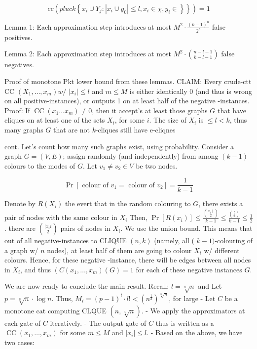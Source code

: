$$
\left.c c\left(p l u c k\left\{x_i \cup Y_j:\left|x_i \cup y_0\right| \leq l, x_i \in \chi, y_i \in\right\}\right\}\right)=1
$$


Lemma 1: Each approximation step introduces at most $M^2 \cdot \frac{(k-1)^n}{2^p}$ false positives.

Lemma 2: Each approximation step introduces at most $M^2 \cdot\binom{n-l-1}{k-l-1}$ false negatives.

Proof of monotone Pkt lower bound from these lemmas. CLAIM: Every crude-ctt CC $\left(X_1, \ldots, x_m\right) w /$ $\left|x_i\right| \leq l$ and $m \leqslant M$ is either identically 0 (and thus is wrong on all positive-instances), or outputs 1 on at least half of the negative -instances.
Proof: If $\operatorname{CC}\left(x_1 \ldots x_m\right) \neq 0$, then it accept's at least those graphs $G$ that have cliques on at least one of the sets $X_i$, for some $i$. The size of $X_i$ is $\leqslant l<k$, thus many graphs $G$ that are not $k$-cliques still have e-cliqnes



cont.
Let's count how many such graphs exist, using probability. Consider a graph $G=(V, E)$; assign randomly (and independently) from among $(k-1)$ colours to the modes of $G$. Let $v_1 \neq v_2 \in V$ be two nodes.

$$
\operatorname{Pr}\left[\text { colour of } v_1=\text { colour of } v_2\right]=\frac{1}{k-1}
$$


Denote by $R\left(X_i\right)$ the evert that in the random colouring to $G$, there exists a pair of nodes with the same colour in $X_i$
Then, $\operatorname{Pr}\left[R\left(x_i\right)\right] \leqslant \frac{\binom{x_i \mid}{ 2}}{k-1} \leqslant \frac{\binom{l}{2}}{k-1} \leqslant \frac{1}{2}$.
there are $\binom{\mid x_i i}{2}$ pairs
of nodes in $X_i$. We use
the union bound.
This means that out of all negative-instances to CLIQUE $(n, k)$ (namely, all ( $k-1)$-colouring of a graph w/ $n$ nodes), at least half of them are going to colour $X_i$ w/ different colours. Hence, for these negative -instance, there will be edges between all nodes in $X_i$, and thus $\left(C\left(x_1, \ldots, x_m\right)(G)=1\right.$ for each of these negative instances $G$.




We are now ready to conclude the main result.
Recall: $l=\sqrt[8]{n}$ and
Let $p=\sqrt[8]{n} \cdot \log n$. Thus, $M_i=(p-1)^l \cdot l!<\left(n^{\frac{1}{3}}\right)^{\sqrt[8]{n}}$, for large
- Let $C$ be a monotone cat computing CLQUE $(n, \sqrt[4]{n})$.
- We apply the approximators at each gate of $C$ iteratively.
- The output gate of $C$ thus is written as a $\operatorname{CC}\left(x_1, \ldots, x_m\right)$ for some $m \leqslant M$ and $\left|x_i\right| \leqslant l$.
- Based on the above, we have two cases:

